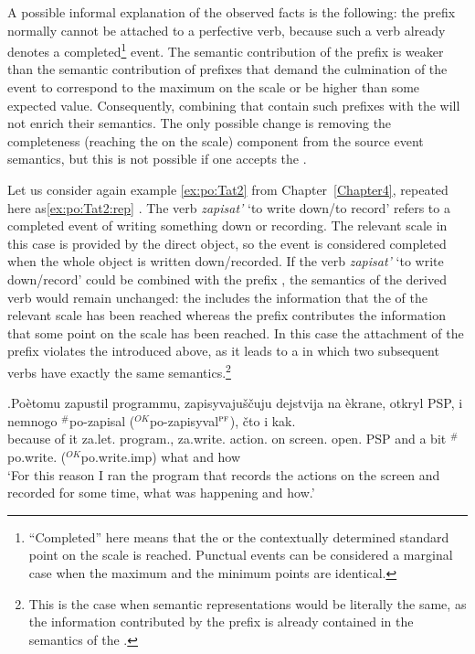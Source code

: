 A possible informal explanation of the observed facts is the following: the  prefix  normally cannot be attached to a perfective verb, because such a verb already denotes a completed\footnote{``Completed'' here means that the  or the contextually determined standard point on the scale is reached. Punctual events can be considered a marginal case when the maximum and the minimum points are identical.} event. The semantic contribution of the prefix  is weaker than the semantic contribution of prefixes that demand the culmination of the event to correspond to the maximum on the scale or be higher than some expected value. Consequently, combining  that contain such prefixes with the   will not enrich their semantics. The only possible change is removing the completeness (reaching the  on the scale) component from the source event semantics, but this is not possible if one accepts the  \citep{Kiparsky:82}.

Let us consider again example \ref{ex:po:Tat2} from Chapter~\ref{Chapter4}, repeated here as\ref{ex:po:Tat2:rep} \citet{Tatevosov:09}. The verb \textit{zapisat'} `to write down/to record' refers to a completed event of writing something down or recording. The relevant scale in this case is provided by the direct object, so the event is considered completed when the whole object is written down/recorded. If the verb \textit{zapisat'} `to write down/record' could be combined with the  prefix , the semantics of the derived verb would remain unchanged: the  includes the information that the  of the relevant scale has been reached whereas the prefix contributes the information that some point on the scale has been reached. In this case the attachment of the prefix violates the  introduced above, as it leads to a  in which two subsequent verbs have exactly the same semantics.\footnote{This is the case when semantic representations would be literally the same, as the information contributed by the prefix is already contained in the semantics of the .}

\exg.\label{ex:po:Tat2:rep}Po\`{e}tomu zapustil programmu, zapisyvaju\v{s}\v{c}uju dejstvija na \`{e}krane, otkryl PSP, i nemnogo $^\#$po-zapisal ($^{\textit{OK}}$po-zapisyval$^{\textsc{pf}}$), \v{c}to i kak.\\
{because of it} za.let. program., za.write. action. on screen. open. PSP and {a bit} $^\#$po.write. ($^{\textit{OK}}$po.write.imp) what and how\\
\trans `For this reason I ran the program that records the actions on the screen and recorded for some time, what was happening and how.'\\ 

